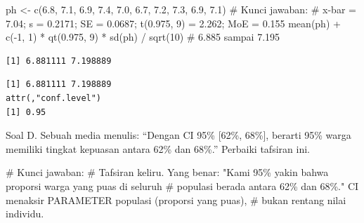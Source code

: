 \documentclass[
  indonesian,
  letterpaper,
]{book}
\newenvironment{Shaded}{\begin{snugshade}}{\end{snugshade}}
\newcommand{\CommentTok}[1]{\textcolor[rgb]{0.37,0.37,0.37}{#1}}
\newcommand{\DecValTok}[1]{\textcolor[rgb]{0.68,0.00,0.00}{#1}}
\newcommand{\FloatTok}[1]{\textcolor[rgb]{0.68,0.00,0.00}{#1}}
\newcommand{\FunctionTok}[1]{\textcolor[rgb]{0.28,0.35,0.67}{#1}}
\newcommand{\NormalTok}[1]{\textcolor[rgb]{0.00,0.23,0.31}{#1}}
\newcommand{\OtherTok}[1]{\textcolor[rgb]{0.00,0.23,0.31}{#1}}
\newcommand{\SpecialCharTok}[1]{\textcolor[rgb]{0.37,0.37,0.37}{#1}}
\begin{document}
\begin{Shaded}
\begin{Highlighting}[]
\NormalTok{ph }\OtherTok{\textless{}{-}} \FunctionTok{c}\NormalTok{(}\FloatTok{6.8}\NormalTok{, }\FloatTok{7.1}\NormalTok{, }\FloatTok{6.9}\NormalTok{, }\FloatTok{7.4}\NormalTok{, }\FloatTok{7.0}\NormalTok{, }\FloatTok{6.7}\NormalTok{, }\FloatTok{7.2}\NormalTok{, }\FloatTok{7.3}\NormalTok{, }\FloatTok{6.9}\NormalTok{, }\FloatTok{7.1}\NormalTok{)}
\CommentTok{\# Kunci jawaban:}
\CommentTok{\# x{-}bar = 7.04; s = 0.2171; SE = 0.0687; t(0.975, 9) = 2.262; MoE = 0.155}
\FunctionTok{mean}\NormalTok{(ph) }\SpecialCharTok{+} \FunctionTok{c}\NormalTok{(}\SpecialCharTok{{-}}\DecValTok{1}\NormalTok{, }\DecValTok{1}\NormalTok{) }\SpecialCharTok{*} \FunctionTok{qt}\NormalTok{(}\FloatTok{0.975}\NormalTok{, }\DecValTok{9}\NormalTok{) }\SpecialCharTok{*} \FunctionTok{sd}\NormalTok{(ph) }\SpecialCharTok{/} \FunctionTok{sqrt}\NormalTok{(}\DecValTok{10}\NormalTok{) }\CommentTok{\# 6.885 sampai 7.195}
\end{Highlighting}
\end{Shaded}

\begin{verbatim}
[1] 6.881111 7.198889
\end{verbatim}

\begin{Shaded}
\end{Shaded}

\begin{verbatim}
[1] 6.881111 7.198889
attr(,"conf.level")
[1] 0.95
\end{verbatim}

Soal D. Sebuah media menulis: ``Dengan CI 95\% {[}62\%, 68\%{]}, berarti
95\% warga memiliki tingkat kepuasan antara 62\% dan 68\%.'' Perbaiki
tafsiran ini.

\begin{Shaded}
\begin{Highlighting}[]
\CommentTok{\# Kunci jawaban:}
\CommentTok{\# Tafsiran keliru. Yang benar: "Kami 95\% yakin bahwa proporsi warga yang puas di seluruh}
\CommentTok{\# populasi berada antara 62\% dan 68\%." CI menaksir PARAMETER populasi (proporsi yang puas),}
\CommentTok{\# bukan rentang nilai individu.}
\end{Highlighting}
\end{Shaded}
\end{document}

